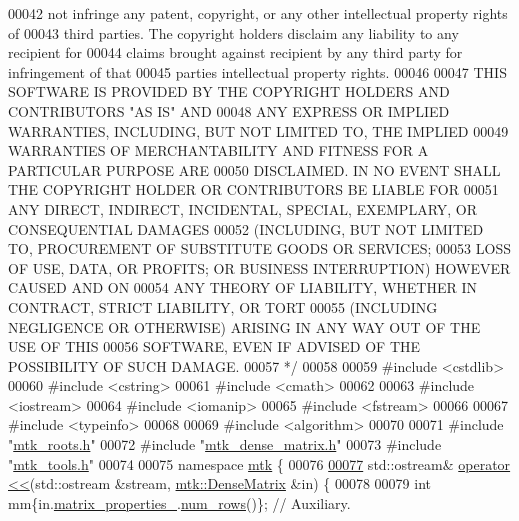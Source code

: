 \begin{DoxyCode}
00042 \textcolor{comment}{not infringe any patent, copyright, or any other intellectual property rights of}
00043 \textcolor{comment}{third parties. The copyright holders disclaim any liability to any recipient for}
00044 \textcolor{comment}{claims brought against recipient by any third party for infringement of that}
00045 \textcolor{comment}{parties intellectual property rights.}
00046 \textcolor{comment}{}
00047 \textcolor{comment}{THIS SOFTWARE IS PROVIDED BY THE COPYRIGHT HOLDERS AND CONTRIBUTORS "AS IS" AND}
00048 \textcolor{comment}{ANY EXPRESS OR IMPLIED WARRANTIES, INCLUDING, BUT NOT LIMITED TO, THE IMPLIED}
00049 \textcolor{comment}{WARRANTIES OF MERCHANTABILITY AND FITNESS FOR A PARTICULAR PURPOSE ARE}
00050 \textcolor{comment}{DISCLAIMED. IN NO EVENT SHALL THE COPYRIGHT HOLDER OR CONTRIBUTORS BE LIABLE FOR}
00051 \textcolor{comment}{ANY DIRECT, INDIRECT, INCIDENTAL, SPECIAL, EXEMPLARY, OR CONSEQUENTIAL DAMAGES}
00052 \textcolor{comment}{(INCLUDING, BUT NOT LIMITED TO, PROCUREMENT OF SUBSTITUTE GOODS OR SERVICES;}
00053 \textcolor{comment}{LOSS OF USE, DATA, OR PROFITS; OR BUSINESS INTERRUPTION) HOWEVER CAUSED AND ON}
00054 \textcolor{comment}{ANY THEORY OF LIABILITY, WHETHER IN CONTRACT, STRICT LIABILITY, OR TORT}
00055 \textcolor{comment}{(INCLUDING NEGLIGENCE OR OTHERWISE) ARISING IN ANY WAY OUT OF THE USE OF THIS}
00056 \textcolor{comment}{SOFTWARE, EVEN IF ADVISED OF THE POSSIBILITY OF SUCH DAMAGE.}
00057 \textcolor{comment}{*/}
00058 
00059 \textcolor{preprocessor}{#include <cstdlib>}
00060 \textcolor{preprocessor}{#include <cstring>}
00061 \textcolor{preprocessor}{#include <cmath>}
00062 
00063 \textcolor{preprocessor}{#include <iostream>}
00064 \textcolor{preprocessor}{#include <iomanip>}
00065 \textcolor{preprocessor}{#include <fstream>}
00066 
00067 \textcolor{preprocessor}{#include <typeinfo>}
00068 
00069 \textcolor{preprocessor}{#include <algorithm>}
00070 
00071 \textcolor{preprocessor}{#include "\hyperlink{mtk__roots_8h}{mtk\_roots.h}"}
00072 \textcolor{preprocessor}{#include "\hyperlink{mtk__dense__matrix_8h}{mtk\_dense\_matrix.h}"}
00073 \textcolor{preprocessor}{#include "\hyperlink{mtk__tools_8h}{mtk\_tools.h}"}
00074 
00075 \textcolor{keyword}{namespace }\hyperlink{namespacemtk}{mtk} \{
00076 
\hypertarget{mtk__dense__matrix_8cc_source_l00077}{}\hyperlink{namespacemtk_ad3bcf52cda59ddb5fc7b4bdce76c46dc}{00077} std::ostream& \hyperlink{namespacemtk_ad3bcf52cda59ddb5fc7b4bdce76c46dc}{operator <<}(std::ostream &stream, \hyperlink{classmtk_1_1DenseMatrix}{mtk::DenseMatrix} &in) \{
00078 
00079   \textcolor{keywordtype}{int} mm\{in.\hyperlink{classmtk_1_1DenseMatrix_a481c8d09af685a5ba67acefdcaa810cc}{matrix\_properties\_}.\hyperlink{classmtk_1_1Matrix_a69feb30fc0018faee65fe9f7cb43e0ed}{num\_rows}()\};  \textcolor{comment}{// Auxiliary.}

\end{DoxyCode}
